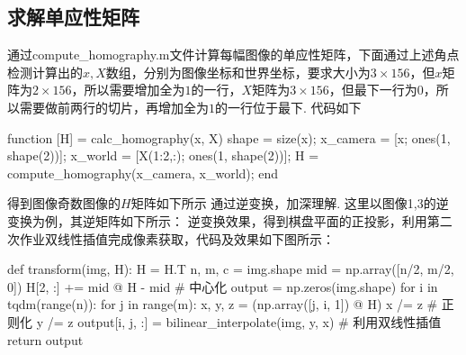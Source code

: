\documentclass[12pt, a4paper, oneside]{ctexart}
\numberwithin{equation}{section}  %
\begin{document}
\subsection{求解单应性矩阵}
通过compute\_homography.m文件计算每幅图像的单应性矩阵，下面通过上述角点检测计算出的$x,X$数组，分别为图像坐标和世界坐标，要求大小为$3\times 156$，但$x$矩阵为$2\times 156$，所以需要增加全为$1$的一行，$X$矩阵为$3\times 156$，但最下一行为$0$，所以需要做前两行的切片，再增加全为$1$的一行位于最下. 代码如下
\begin{matlabcode}
function [H] = calc_homography(x, X)
    shape = size(x);
    x_camera = [x; ones(1, shape(2))];
    x_world = [X(1:2,:); ones(1, shape(2))];
    H = compute_homography(x_camera, x_world);
end
\end{matlabcode}
得到图像奇数图像的$H$矩阵如下所示
通过逆变换，加深理解. 这里以图像1,3的逆变换为例，其逆矩阵如下所示：
逆变换效果，得到棋盘平面的正投影，利用第二次作业双线性插值完成像素获取，代码及效果如下图所示：
\clearpage
\begin{figure}[htbp]
\end{figure}
\begin{pythoncode}
def transform(img, H):
H = H.T
n, m, c = img.shape
mid = np.array([n/2, m/2, 0])
H[2, :] += mid @ H - mid  # 中心化
output = np.zeros(img.shape)
for i in tqdm(range(n)):
    for j in range(m):
        x, y, z = (np.array([j, i, 1]) @ H)
        x /= z  # 正则化
        y /= z
        output[i, j, :] = bilinear_interpolate(img, y, x)  # 利用双线性插值
return output
\end{pythoncode}
\end{document}

